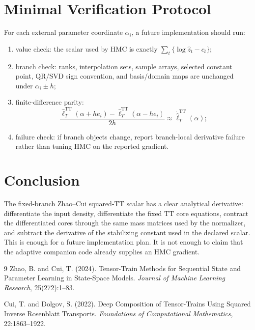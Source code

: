 \documentclass[11pt]{article}
\newcommand{\TT}{\mathrm{TT}}
\begin{document}
\section{Minimal Verification Protocol}

For each external parameter coordinate \(\alpha_i\), a future implementation
should run:
\begin{enumerate}[leftmargin=*]
\item value check: the scalar used by HMC is exactly
  \(\sum_t\{\log \widehat z_t-c_t\}\);
\item branch check: ranks, interpolation sets, sample arrays, selected
  constant point, QR/SVD sign convention, and basis/domain maps are unchanged
  under \(\alpha_i\pm h\);
\item finite-difference parity:
  \[
    \frac{\widehat\ell_T^{\TT}(\alpha+h e_i)
          -\widehat\ell_T^{\TT}(\alpha-h e_i)}{2h}
    \approx
    \dot{\widehat\ell}_T^{\TT}(\alpha);
  \]
\item failure check: if branch objects change, report branch-local derivative
  failure rather than tuning HMC on the reported gradient.
\end{enumerate}

\section{Conclusion}

The fixed-branch Zhao--Cui squared-TT scalar has a clear analytical derivative:
differentiate the input density, differentiate the fixed TT core equations,
contract the differentiated cores through the same mass matrices used by the
normalizer, and subtract the derivative of the stabilizing constant used in
the declared scalar.  This is enough for a future implementation plan.  It is
not enough to claim that the adaptive companion code already supplies an HMC
gradient.

\begin{thebibliography}{9}
Zhao, B. and Cui, T. (2024).
\newblock Tensor-Train Methods for Sequential State and Parameter Learning in
State-Space Models.
\newblock \emph{Journal of Machine Learning Research}, 25(272):1--83.

Cui, T. and Dolgov, S. (2022).
\newblock Deep Composition of Tensor-Trains Using Squared Inverse Rosenblatt
Transports.
\newblock \emph{Foundations of Computational Mathematics}, 22:1863--1922.
\end{thebibliography}
\end{document}
